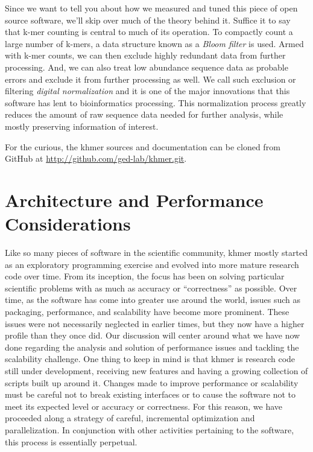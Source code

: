 \documentclass{article}
\begin{document}

Since we want to tell you about how we measured and tuned this piece of open source software, we'll skip over much of the theory behind it. Suffice it to say that k-mer counting is central to much of its operation. To compactly count a large number of k-mers, a data structure known as a \textit{Bloom filter} \citep{web:BloomFilter} is used. Armed with k-mer counts, we can then exclude highly redundant data from further processing. And, we can also treat low abundance sequence data as probable errors and exclude it from further processing as well. We call such exclusion or filtering \textit{digital normalization} and it is one of the major innovations that this software has lent to bioinformatics processing. This normalization process greatly reduces the amount of raw sequence data needed for further analysis, while mostly preserving information of interest.

For the curious, the khmer sources and documentation can be cloned from GitHub at \url{http://github.com/ged-lab/khmer.git}.

\section{Architecture and Performance Considerations}

Like so many pieces of software in the scientific community, khmer mostly started as an exploratory programming exercise and evolved into more mature research code over time. From its inception, the focus has been on solving particular scientific problems with as much as accuracy or ``correctness'' as possible. Over time, as the software has come into greater use around the world, issues such as packaging, performance, and scalability have become more prominent. These issues were not necessarily neglected in earlier times, but they now have a higher profile than they once did. Our discussion will center around what we have now done regarding the analysis and solution of performance issues and tackling the scalability challenge. One thing to keep in mind is that khmer is research code still under development, receiving new features and having a growing collection of scripts built up around it. Changes made to improve performance or scalability must be careful not to break existing interfaces or to cause the software not to meet its expected level or accuracy or correctness. For this reason, we have proceeded along a strategy of careful, incremental optimization and parallelization. In conjunction with other activities pertaining to the software, this process is essentially perpetual.
\end{document}
